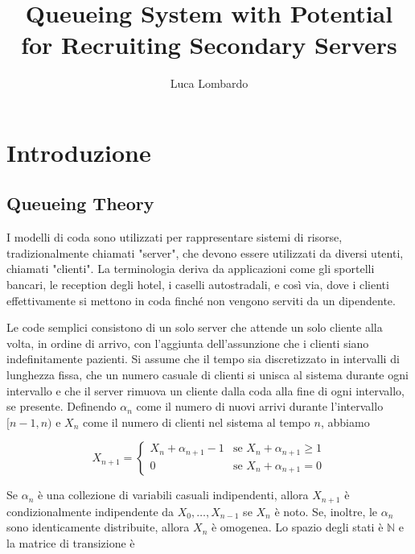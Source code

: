 \documentclass[11pt]{article}
\title{Queueing System with Potential for Recruiting Secondary Servers}
\author{Luca Lombardo}
\date{}
\newcommand{\N}{\mathbb{N}}
\begin{document}
\maketitle
\tableofcontents

\section{Introduzione}



\subsection{Queueing Theory}

I modelli di coda sono utilizzati per rappresentare sistemi di risorse, tradizionalmente chiamati "server", che devono essere utilizzati da diversi utenti, chiamati "clienti". La terminologia deriva da applicazioni come gli sportelli bancari, le reception degli hotel, i caselli autostradali, e così via, dove i clienti effettivamente si mettono in coda finché non vengono serviti da un dipendente. \vspace*{0.4cm}

\noindent Le code semplici consistono di un solo server che attende un solo cliente alla volta, in ordine di arrivo, con l'aggiunta dell'assunzione che i clienti siano indefinitamente pazienti. Si assume che il tempo sia discretizzato in intervalli di lunghezza fissa, che un numero casuale di clienti si unisca al sistema durante ogni intervallo e che il server rimuova un cliente dalla coda alla fine di ogni intervallo, se presente. Definendo $\alpha_n$ come il numero di nuovi arrivi durante l'intervallo $[n - 1, n)$ e $X_n$ come il numero di clienti nel sistema al tempo $n$, abbiamo

\begin{equation}
    X_{n+1} =
    \begin{cases}
        X_n + \alpha_{n+1} - 1 & \text{se } X_n + \alpha_{n+1} \geq 1 \\
        0 & \text{se } X_n + \alpha_{n+1} = 0
    \end{cases}
\end{equation}

\noindent Se ${\alpha_n}$ è una collezione di variabili casuali indipendenti, allora $X_{n+1}$ è condizionalmente indipendente da $X_0, \ldots, X_{n-1}$ se $X_n$ è noto. Se, inoltre, le $\alpha_n$ sono identicamente distribuite, allora ${X_n}$ è omogenea. Lo spazio degli stati è $\N$ e la matrice di transizione è
\end{document}
